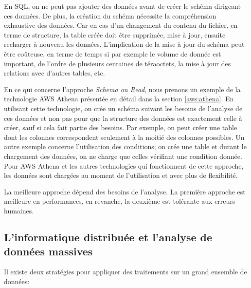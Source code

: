 En SQL, on ne peut pas ajouter des données avant de créer le schéma dirigeant ces données. De plus, la création du schéma nécessite la compréhension  exhaustive des données. 
Car en cas d'un changement du contenu du fichier, en terme de structure, la table créée doit être supprimée, mise à jour, ensuite recharger à nouveau les données. L'implication de la mise à jour du schéma peut être coûteuse, en terme de temps  si par exemple  le volume de donnée est important, de l'ordre de plusieurs centaines de téraoctets, la mise à jour des relations avec d'autres tables, etc.

En ce qui concerne l'approche \textit{Schema on Read}, nous prenons un exemple de la technologie AWS Athena présentée en détail dans la section \ref{aws:athena}. En utilisant cette technologie, on crée un schéma suivant les besoins de l'analyse de ces données et non pas pour que la structure des données est exactement celle à créer, sauf si cela fait partie des besoins. Par exemple, on peut créer une table dont les colonnes correspondent  seulement à la moitié des colonnes possibles. Un autre exemple concerne l'utilisation  des conditions; on crée une table et durant le chargement des données, on ne charge que celles vérifiant une condition donnée. Pour AWS Athena et les autres technologies qui fonctionnent de cette approche, les données sont chargées au moment de l'utilisation et avec plus de flexibilité.

		
La meilleure approche dépend des besoins de l'analyse. La première approche est meilleure en performances, en revanche, la deuxième est tolérante aux erreurs  humaines.
		
		
		\subsection{L'informatique distribuée et l'analyse de données massives} \label{sec:distruted-camput}
		Il existe deux stratégies pour appliquer des traitements sur un grand ensemble de données: 
		
